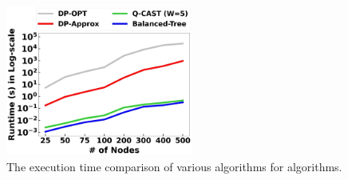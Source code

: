 \begin{figure}
    \centering
    \includegraphics[width=0.55\textwidth]{chapters/tqe/figures/runtime-sp.png}
    \caption{The execution time comparison of various algorithms for \spp algorithms.}
    \label{fig:swapping_runtime}
\end{figure}




    


